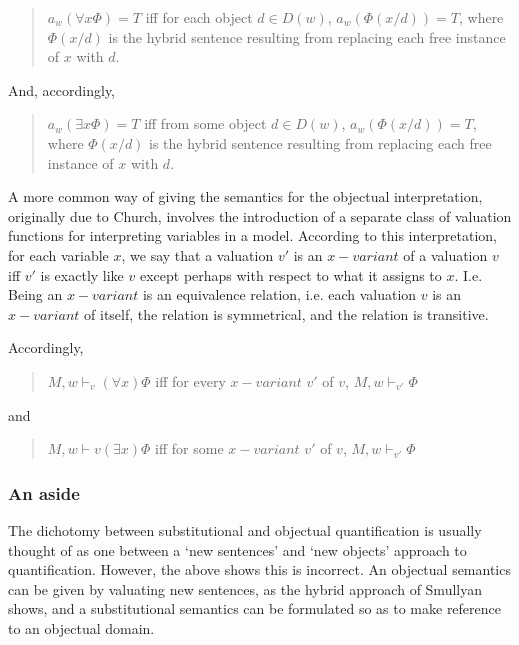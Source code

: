 \documentclass[]{article}
\begin{document}
\begin{quote}
$a_{w}(\forall x \Phi) = T$ iff for each object $d \in D(w)$, $a_{w}(\Phi(x/d)) = T$, where $\Phi(x/d)$ is the hybrid sentence resulting from replacing each free instance of $x$ with $d$.
\end{quote}

And, accordingly, 

\begin{quote}
$a_{w}(\exists x \Phi) = T$ iff from some object $d \in D(w)$, $a_{w}(\Phi(x/d)) = T$, where $\Phi(x/d)$ is the hybrid sentence resulting from replacing each free instance of $x$ with $d$.
\end{quote}

A more common way of giving the semantics for the objectual interpretation, originally due to Church, involves the introduction of a separate class of valuation functions for interpreting variables in a model. According to this interpretation, for each variable $x$, we say that a valuation $v'$ is an $x-variant$ of a valuation $v$ iff $v'$ is exactly like $v$ except perhaps with respect to what it assigns to $x$. I.e. Being an $x-variant$ is an equivalence relation, i.e. each valuation $v$ is an $x-variant$ of itself, the relation is symmetrical, and the relation is transitive.

Accordingly, 
\begin{quote}
$M, w\vdash_{v} (\forall x) \Phi$ iff for every $x-variant$ $v'$ of $v$, $M, w \vdash_{v'} \Phi$
\end{quote}
and 
\begin{quote}
$M, w \vdash{v} (\exists x) \Phi$ iff for some $x-variant$ $v'$ of $v$, $M, w \vdash_{v'} \Phi$
\end{quote}

\subsubsection{An aside}
The dichotomy between substitutional and objectual quantification is usually thought of as one between a `new sentences' and `new objects' approach to quantification. However, the above shows this is incorrect. An objectual semantics can be given by valuating new sentences, as the hybrid approach of Smullyan shows, and a substitutional semantics can be formulated so as to make reference to an objectual domain.
\end{document}

